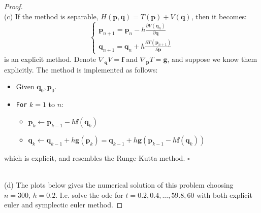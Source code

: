 \documentclass[a4paper, 10pt]{article}
\theoremstyle{definition}
\theoremstyle{hSol}
\begin{document}
\begin{proof}
~\\
(c) If the method is separable, $H(\bm{p}, \bm{q}) = T(\bm{p}) + V(\bm{q})$, then it becomes:
\begin{equation}
  \begin{cases}
    \bm{p}_{n+1} = \bm{p}_n - h \frac{\partial V(\bm{q}_n)}{\partial \bm{q}} \\
    \bm{q}_{n+1} = \bm{q}_n + h \frac{\partial T(\bm{p}_{n+1})}{\partial \bm{p}}
  \end{cases}
\end{equation}
is an explicit method. Denote $\nabla_{\bm{q}} V = \bm{f}$ and $\nabla_{\bm{p}}T = \bm{g}$, and suppose we know them explicitly. The method is implemented as follows:
\begin{itemize}
  \item[] Given $\bm{q}_0, \bm{p}_0$.
  \item[] \texttt{For} $k = 1$ to $n$:
  \begin{itemize}
    \item[] $\bm{p}_k \leftarrow \bm{p}_{k-1} - h \bm{f}(\bm{q}_k)$
    \item[] $\bm{q}_k \leftarrow \bm{q}_{k-1} + h \bm{g}(\bm{p}_k) = \bm{q}_{k-1} + h \bm{g}(\bm{p}_{k-1} - h \bm{f}(\bm{q}_k))$
  \end{itemize}
\end{itemize}
which is explicit, and resembles the Runge-Kutta method. $\square$

~\\
(d) The plots below gives the numerical solution of this problem choosing $n=300$, $h=0.2$. I.e. solve the ode for $t=0.2, 0.4, ..., 59.8, 60$ with both explicit euler and symplectic euler method.


\end{proof}
\end{document}
